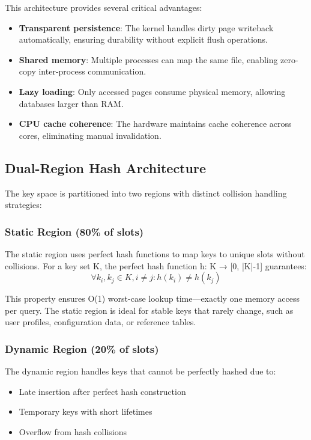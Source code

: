 \documentclass[11pt]{article}
\begin{document}
This architecture provides several critical advantages:

\begin{itemize}
\item \textbf{Transparent persistence}: The kernel handles dirty page writeback automatically, ensuring durability without explicit flush operations.
\item \textbf{Shared memory}: Multiple processes can map the same file, enabling zero-copy inter-process communication.
\item \textbf{Lazy loading}: Only accessed pages consume physical memory, allowing databases larger than RAM.
\item \textbf{CPU cache coherence}: The hardware maintains cache coherence across cores, eliminating manual invalidation.
\end{itemize}

\subsection{Dual-Region Hash Architecture}

The key space is partitioned into two regions with distinct collision handling strategies:

\subsubsection{Static Region (80\% of slots)}
The static region uses perfect hash functions to map keys to unique slots without collisions. For a key set K, the perfect hash function h: K → [0, |K|-1] guarantees:
\begin{equation}
\forall k_i, k_j \in K, i \neq j : h(k_i) \neq h(k_j)
\end{equation}

This property ensures O(1) worst-case lookup time—exactly one memory access per query. The static region is ideal for stable keys that rarely change, such as user profiles, configuration data, or reference tables.

\subsubsection{Dynamic Region (20\% of slots)}
The dynamic region handles keys that cannot be perfectly hashed due to:
\begin{itemize}
\item Late insertion after perfect hash construction
\item Temporary keys with short lifetimes
\item Overflow from hash collisions
\end{itemize}
\end{document}
